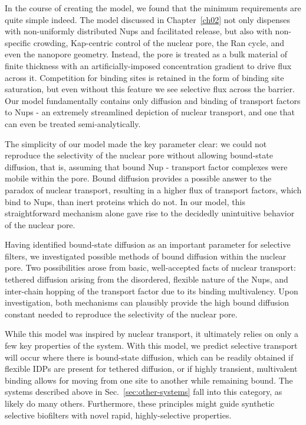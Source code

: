 In the course of creating the model, we found that the minimum requirements are quite simple indeed.  The model discussed in Chapter~\ref{ch02} not only dispenses with non-uniformly distributed Nups and facilitated release, but also with non-specific crowding, Kap-centric control of the nuclear pore, the Ran cycle, and even the nanopore geometry.  Instead, the pore is treated as a bulk material of finite thickness with an artificially-imposed concentration gradient to drive flux across it.  Competition for binding sites is retained in the form of binding site saturation, but even without this feature we see selective flux across the barrier.  Our model fundamentally contains only diffusion and binding of transport factors to Nups - an extremely streamlined depiction of nuclear transport, and one that can even be treated semi-analytically.

The simplicity of our model made the key parameter clear: we could not reproduce the selectivity of the nuclear pore without allowing bound-state diffusion, that is, assuming that bound Nup - transport factor complexes were mobile within the pore.  Bound diffusion provides a possible answer to the paradox of nuclear transport, resulting in a higher flux of transport factors, which bind to Nups, than inert proteins which do not.  In our model, this straightforward mechanism alone gave rise to the decidedly unintuitive behavior of the nuclear pore.

Having identified bound-state diffusion as an important parameter for selective filters, we investigated possible methods of bound diffusion within the nuclear pore.  Two possibilities arose from basic, well-accepted facts of nuclear transport: tethered diffusion arising from the disordered, flexible nature of the Nups, and inter-chain hopping of the transport factor due to its binding multivalency.  Upon investigation, both mechanisms can plausibly provide the high bound diffusion constant needed to reproduce the selectivity of the nuclear pore.

While this model was inspired by nuclear transport, it ultimately relies on only a few key properties of the system.  With this model, we predict selective transport will occur where there is bound-state diffusion, which can be readily obtained if flexible IDPs are present for tethered diffusion, or if highly transient, multivalent binding allows for moving from one site to another while remaining bound.  The systems described above in Sec.~\ref{sec:other-systems} fall into this category, as likely do many others.  Furthermore, these principles might guide synthetic selective biofilters with novel rapid, highly-selective properties.


